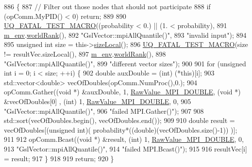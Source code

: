 \begin{DoxyCode}
886 \{
887   \textcolor{comment}{// Filter out those nodes that should not participate}
888   \textcolor{keywordflow}{if} (opComm.MyPID() < 0) \textcolor{keywordflow}{return};
889 
890   \hyperlink{_defines_8h_a56d63d18d0a6d45757de47fcc06f574d}{UQ\_FATAL\_TEST\_MACRO}((probability < 0.) || (1. < probability),
891                       \hyperlink{class_q_u_e_s_o_1_1_vector_ae7615172bb1e54339151d3f3d71a0344}{m\_env}.\hyperlink{class_q_u_e_s_o_1_1_base_environment_a78b57112bbd0e6dd0e8afec00b40ffa7}{worldRank}(),
892                       \textcolor{stringliteral}{"GslVector::mpiAllQuantile()"},
893                       \textcolor{stringliteral}{"invalid input"});
894 
895   \textcolor{keywordtype}{unsigned} \textcolor{keywordtype}{int} size = this->\hyperlink{class_q_u_e_s_o_1_1_gsl_vector_ace6fb1739b7cf6456b3dcde84c766fb3}{sizeLocal}();
896   \hyperlink{_defines_8h_a56d63d18d0a6d45757de47fcc06f574d}{UQ\_FATAL\_TEST\_MACRO}(size != resultVec.sizeLocal(),
897                       \hyperlink{class_q_u_e_s_o_1_1_vector_ae7615172bb1e54339151d3f3d71a0344}{m\_env}.\hyperlink{class_q_u_e_s_o_1_1_base_environment_a78b57112bbd0e6dd0e8afec00b40ffa7}{worldRank}(),
898                       \textcolor{stringliteral}{"GslVector::mpiAllQuantile()"},
899                       \textcolor{stringliteral}{"different vector sizes"});
900 
901   \textcolor{keywordflow}{for} (\textcolor{keywordtype}{unsigned} \textcolor{keywordtype}{int} i = 0; i < size; ++i) \{
902     \textcolor{keywordtype}{double} auxDouble = (int) (*\textcolor{keyword}{this})[i];
903     std::vector<double> vecOfDoubles(opComm.NumProc(),0.);
904     opComm.Gather((\textcolor{keywordtype}{void} *) &auxDouble, 1, \hyperlink{_mpi_comm_8h_ad0f503bd9fecfe4e570ca3d15aaf2518}{RawValue\_MPI\_DOUBLE}, (\textcolor{keywordtype}{void} *) &vecOfDoubles[0]
      , (\textcolor{keywordtype}{int}) 1, \hyperlink{_mpi_comm_8h_ad0f503bd9fecfe4e570ca3d15aaf2518}{RawValue\_MPI\_DOUBLE}, 0,
905                   \textcolor{stringliteral}{"GslVector::mpiAllQuantile()"},
906                   \textcolor{stringliteral}{"failed MPI.Gather()"});
907 
908     std::sort(vecOfDoubles.begin(), vecOfDoubles.end());
909 
910     \textcolor{keywordtype}{double} result = vecOfDoubles[(\textcolor{keywordtype}{unsigned} int)( probability*((\textcolor{keywordtype}{double})(vecOfDoubles.size()-1)) )];
911 
912     opComm.Bcast((\textcolor{keywordtype}{void} *) &result, (\textcolor{keywordtype}{int}) 1, \hyperlink{_mpi_comm_8h_ad0f503bd9fecfe4e570ca3d15aaf2518}{RawValue\_MPI\_DOUBLE}, 0,
913                  \textcolor{stringliteral}{"GslVector::mpiAllQuantile()"},
914                  \textcolor{stringliteral}{"failed MPI.Bcast()"});
915 
916     resultVec[i] = result;
917   \}
918 
919   \textcolor{keywordflow}{return};
920 \}
\end{DoxyCode}
